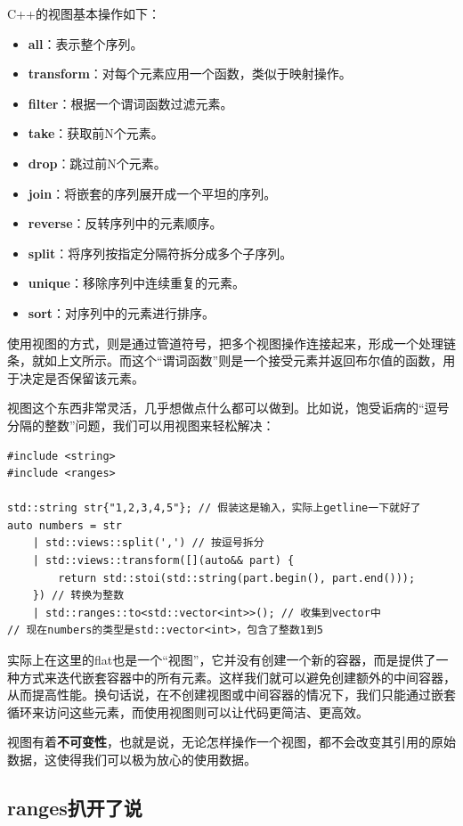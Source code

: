 C++的视图基本操作如下：
\begin{itemize}
    \item \textbf{all}：表示整个序列。
    \item \textbf{transform}：对每个元素应用一个函数，类似于映射操作。
    \item \textbf{filter}：根据一个谓词函数过滤元素。
    \item \textbf{take}：获取前N个元素。
    \item \textbf{drop}：跳过前N个元素。
    \item \textbf{join}：将嵌套的序列展开成一个平坦的序列。
    \item \textbf{reverse}：反转序列中的元素顺序。
    \item \textbf{split}：将序列按指定分隔符拆分成多个子序列。
    \item \textbf{unique}：移除序列中连续重复的元素。
    \item \textbf{sort}：对序列中的元素进行排序。
\end{itemize}

使用视图的方式，则是通过管道符号，把多个视图操作连接起来，形成一个处理链条，就如上文所示。而这个“谓词函数”则是一个接受元素并返回布尔值的函数，用于决定是否保留该元素。

视图这个东西非常灵活，几乎想做点什么都可以做到。比如说，饱受诟病的“逗号分隔的整数”问题，我们可以用视图来轻松解决：
\begin{verbatim}
#include <string>
#include <ranges>

std::string str{"1,2,3,4,5"}; // 假装这是输入，实际上getline一下就好了
auto numbers = str
    | std::views::split(',') // 按逗号拆分
    | std::views::transform([](auto&& part) {
        return std::stoi(std::string(part.begin(), part.end()));
    }) // 转换为整数
    | std::ranges::to<std::vector<int>>(); // 收集到vector中
// 现在numbers的类型是std::vector<int>，包含了整数1到5
\end{verbatim}

实际上在这里的flat也是一个“视图”，它并没有创建一个新的容器，而是提供了一种方式来迭代嵌套容器中的所有元素。这样我们就可以避免创建额外的中间容器，从而提高性能。换句话说，在不创建视图或中间容器的情况下，我们只能通过嵌套循环来访问这些元素，而使用视图则可以让代码更简洁、更高效。

视图有着\textbf{不可变性}，也就是说，无论怎样操作一个视图，都不会改变其引用的原始数据，这使得我们可以极为放心的使用数据。

\subsection{ranges扒开了说}

